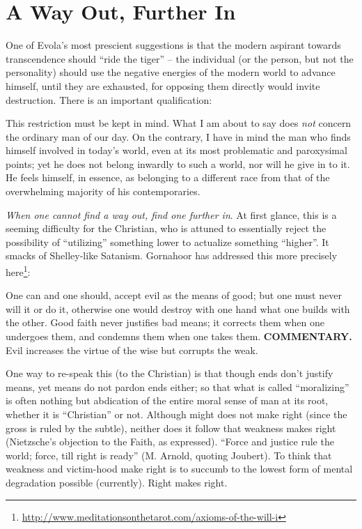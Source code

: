\section{A Way Out, Further In}

One of Evola's most prescient suggestions is that the modern aspirant towards transcendence should ``ride the tiger'' -- the individual (or the person, but not the personality) should use the negative energies of the modern world to advance himself, until they are exhausted, for opposing them directly would invite destruction. There is an important qualification:

\begin{quotex}
This restriction must be kept in mind. What I am about to say does \emph{not} concern the ordinary man of our day. On the contrary, I have in mind the man who finds himself involved in today's world, even at its most problematic and paroxysimal points; yet he does not belong inwardly to such a world, nor will he give in to it. He feels himself, in essence, as belonging to a different race from that of the overwhelming majority of his contemporaries.
\end{quotex}


\emph{When one cannot find a way out, find one further in}. At first glance, this is a seeming difficulty for the Christian, who is attuned to essentially reject the possibility of ``utilizing'' something lower to actualize something ``higher''. It smacks of Shelley-like Satanism. Gornahoor has addressed this more precisely here\footnote{\url{http://www.meditationsonthetarot.com/axioms-of-the-will-i}}:

\begin{quotex}
One can and one should, accept evil as the means of good; but one must never will it or do it, otherwise one would destroy with one hand what one builds with the other. Good faith never justifies bad means; it corrects them when one undergoes them, and condemns them when one takes them. \textbf{COMMENTARY.} Evil increases the virtue of the wise but corrupts the weak.
\end{quotex}

One way to re-speak this (to the Christian) is that though ends don't justify means, yet means do not pardon ends either; so that what is called ``moralizing'' is often nothing but abdication of the entire moral sense of man at its root, whether it is ``Christian'' or not. Although might does not make right (since the gross is ruled by the subtle), neither does it follow that weakness makes right (Nietzsche's objection to the Faith, as expressed). ``Force and justice rule the world; force, till right is ready'' (M. Arnold, quoting Joubert). To think that weakness and victim-hood make right is to succumb to the lowest form of mental degradation possible (currently). Right makes right.

